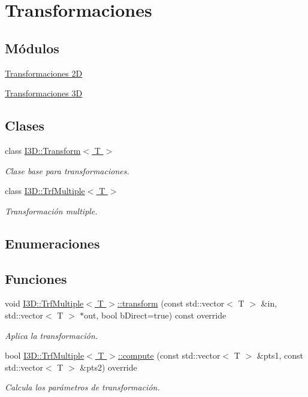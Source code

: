 \hypertarget{group__trf_group}{}\section{Transformaciones}
\label{group__trf_group}
\subsection*{Módulos}
\begin{DoxyCompactItemize}
\item 
\hyperlink{group__trf2_d_group}{Transformaciones 2D}
\item 
\hyperlink{group__trf3_d_group}{Transformaciones 3D}
\end{DoxyCompactItemize}
\subsection*{Clases}
\begin{DoxyCompactItemize}
\item 
class \hyperlink{class_i3_d_1_1_transform}{I3\+D\+::\+Transform$<$ T $>$}
\begin{DoxyCompactList}\small\item\em Clase base para transformaciones. \end{DoxyCompactList}\item 
class \hyperlink{class_i3_d_1_1_trf_multiple}{I3\+D\+::\+Trf\+Multiple$<$ T $>$}
\begin{DoxyCompactList}\small\item\em Transformación multiple. \end{DoxyCompactList}\end{DoxyCompactItemize}
\subsection*{Enumeraciones}
\subsection*{Funciones}
\begin{DoxyCompactItemize}
\item 
void \hyperlink{group__trf_group_gad8eb1ca9e9b9c6e6d30f1f1b15dee818}{I3\+D\+::\+Trf\+Multiple$<$ T $>$\+::transform} (const std\+::vector$<$ T $>$ \&in, std\+::vector$<$ T $>$ $\ast$out, bool b\+Direct=true) const  override
\begin{DoxyCompactList}\small\item\em Aplica la transformación. \end{DoxyCompactList}\item 
bool \hyperlink{group__trf_group_ga30e6b58e89d4ad3657e1b6a74edc22cc}{I3\+D\+::\+Trf\+Multiple$<$ T $>$\+::compute} (const std\+::vector$<$ T $>$ \&pts1, const std\+::vector$<$ T $>$ \&pts2) override
\begin{DoxyCompactList}\small\item\em Calcula los parámetros de transformación. \end{DoxyCompactList}\end{DoxyCompactItemize}

